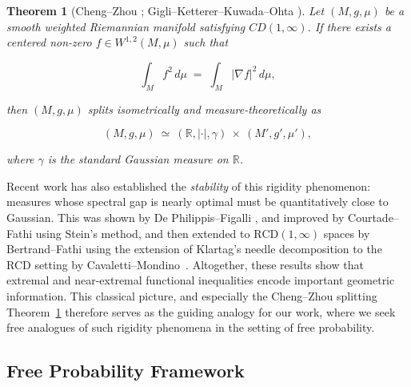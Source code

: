\documentclass[10pt,a4paper,reqno]{amsart}
\newtheorem{theorem}{Theorem}[section]
\begin{document}
\begin{theorem}[Cheng--Zhou \cite{ChengZhou}; Gigli--Ketterer--Kuwada--Ohta \cite{GKKO}]\label{cheng}
Let $(M,g,\mu)$ be a smooth weighted Riemannian manifold satisfying $CD(1,\infty)$.  
If there exists a centered non-zero $f\in W^{1,2}(M,\mu)$ such that


\[
\int_M f^2\,d\mu \;=\; \int_M |\nabla f|^2\,d\mu,
\]


then $(M,g,\mu)$ splits isometrically and measure-theoretically as


\[
(M,g,\mu)\ \simeq\ (\mathbb{R},|\cdot|,\gamma)\ \times\ (M',g',\mu'),
\]


where $\gamma$ is the standard Gaussian measure on $\mathbb{R}$.
\end{theorem}
\par\vspace{0.5em}
Recent work has also established the \emph{stability} of this rigidity phenomenon: measures whose spectral gap is nearly optimal must be quantitatively close to Gaussian.  This was shown by De Philippis--Figalli \cite{DeFiga}, and improved by Courtade--Fathi \cite{CourtF} using Stein’s method, and then extended to $\mathrm{RCD}(1,\infty)$ spaces by Bertrand--Fathi \cite{FatB} using the extension of Klartag’s needle decomposition \cite{Klart} to the RCD setting by Cavaletti--Mondino~\cite{Cav}.  Altogether, these results show that extremal and near-extremal functional inequalities encode important geometric information.  This classical picture, and especially the Cheng--Zhou splitting Theorem~\ref{cheng} therefore serves as the guiding analogy for our work, where we seek free analogues of such rigidity phenomena in the setting of free probability.


\subsection{Free Probability Framework}
\end{document}
